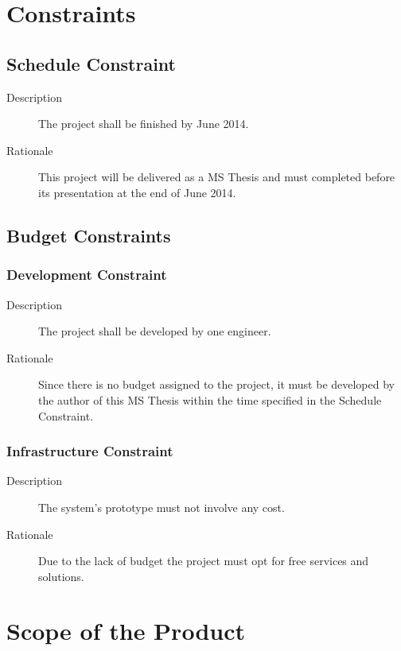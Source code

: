 \section{Constraints} \label{constraints}
\subsection{Schedule Constraint}

\begin{description}
\item[Description] The project shall be finished by June 2014.
\item[Rationale] This project will be delivered as a MS Thesis and must completed before its presentation at the end of June 2014.
\end{description}

\subsection{Budget Constraints}

\subsubsection{Development Constraint}

\begin{description}
\item[Description] The project shall be developed by one engineer.
\item[Rationale] Since there is no budget assigned to the project, it must be developed by the author of this MS Thesis within the time specified in the Schedule Constraint.
\end{description}

\subsubsection{Infrastructure Constraint}

\begin{description}
\item[Description] The system's prototype must not involve any cost.
\item[Rationale] Due to the lack of budget the project must opt for free services and solutions.
\end{description}

\section{Scope of the Product}


